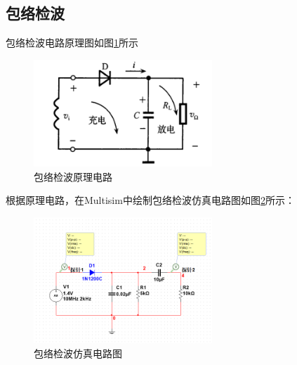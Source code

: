 \documentclass[UTF8]{ctexart}
\begin{document}
\subsection{包络检波}
包络检波电路原理图如图\ref{img:4}所示
\begin{figure}[htbp]
    \centering
    \includegraphics[width=0.6\textwidth]{4.png}
    \caption{包络检波原理电路}
    \label{img:4}
\end{figure}
根据原理电路，在Multisim中绘制包络检波仿真电路图如图\ref{img:5}所示：
\begin{figure}[htbp]
    \centering
    \includegraphics[width=0.6\textwidth]{5.png}
    \caption{包络检波仿真电路图}
    \label{img:5}
\end{figure}
\end{document}
